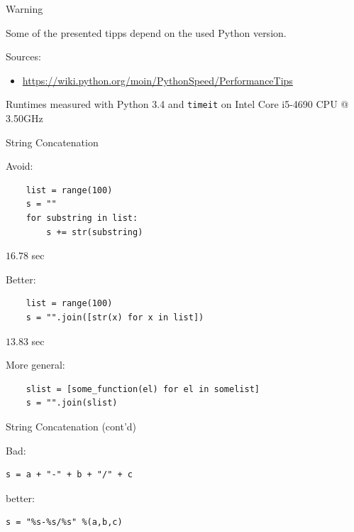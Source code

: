 \documentclass[t,handout]{beamer}
\begin{document}
\begin{frame}[c]{Warning}

{\large
\centering
Some of the presented tipps depend on the used Python version.
}

\bigskip
\pause
Sources:
\begin{itemize}
  \item \url{https://wiki.python.org/moin/PythonSpeed/PerformanceTips}
\end{itemize}

\bigskip
Runtimes measured with Python 3.4 and \texttt{timeit}
on Intel Core i5-4690 CPU @ 3.50GHz

\end{frame}
\begin{frame}[c,fragile]{String Concatenation}

Avoid:
\begin{verbatim}
    list = range(100)
    s = ""
    for substring in list:
        s += str(substring)
\end{verbatim}

$16.78$ sec 

\medskip
\pause
Better:
\begin{verbatim}
    list = range(100)
    s = "".join([str(x) for x in list])    
\end{verbatim}

$13.83$ sec

\medskip
\pause
More general:
\begin{verbatim}
    slist = [some_function(el) for el in somelist]
    s = "".join(slist)
\end{verbatim}

\end{frame}
\begin{frame}[c,fragile]{String Concatenation (cont'd)}

Bad:
\begin{verbatim}
s = a + "-" + b + "/" + c
\end{verbatim}

\medskip
\pause

better:
\begin{verbatim}
s = "%s-%s/%s" %(a,b,c)
\end{verbatim}

\end{frame}
\end{document}
